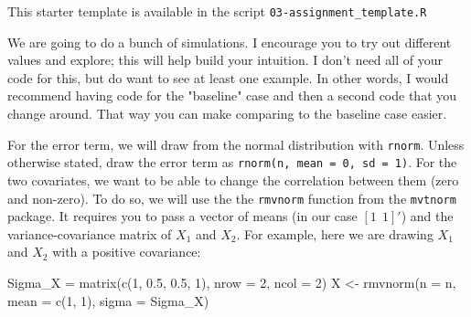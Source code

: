 \documentclass[12pt]{article}
\begin{document}
This starter template is available in the script \texttt{03-assignment\_template.R}

We are going to do a bunch of simulations. 
I encourage you to try out different values and explore; this will help build your intuition. 
I don't need all of your code for this, but do want to see at least one example.
In other words, I would recommend having code for the "baseline" case and then a second code that you change around. That way you can make comparing to the baseline case easier.

For the error term, we will draw from the normal distribution with \texttt{rnorm}. Unless otherwise stated, draw the error term as \texttt{rnorm(n, mean = 0, sd = 1)}. 
For the two covariates, we want to be able to change the correlation between them (zero and non-zero). 
To do so, we will use the the \texttt{rmvnorm} function from the \texttt{mvtnorm} package.
It requires you to pass a vector of means (in our case $[1 \ \ 1]'$) and the variance-covariance matrix of $X_1$ and $X_2$. 
For example, here we are drawing $X_1$ and $X_2$ with a positive covariance:
\begin{codeblock}
Sigma_X = matrix(c(1, 0.5, 0.5, 1), nrow = 2, ncol = 2)
X <- rmvnorm(n = n, mean = c(1, 1), sigma = Sigma_X)
\end{codeblock}
\end{document}
